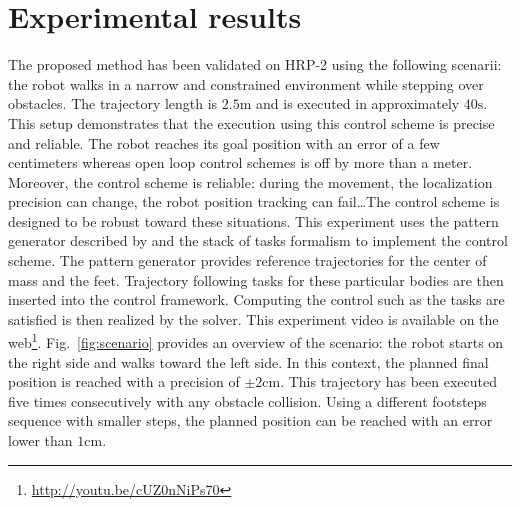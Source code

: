 \section{Experimental results}
\label{exp}
%
%
The proposed method has been validated on HRP-2 using the following
scenarii: the robot walks in a narrow and constrained environment
while stepping over obstacles. The trajectory length is
$2.5\mathrm{m}$ and is executed in approximately $40\mathrm{s}$.
%
%
This setup demonstrates that the execution using this control scheme
is precise and reliable. The robot reaches its goal position with an
error of a few centimeters whereas open loop control schemes is off by
more than a meter. Moreover, the control scheme is reliable: during
the movement, the localization precision can change, the robot
position tracking can fail\ldots The control scheme is designed to be
robust toward these situations.
%
%
This experiment uses the pattern generator described by
\cite{10icra.perrin} and the stack of tasks formalism
\cite{09icar.mansard} to implement the control scheme. The pattern
generator provides reference trajectories for the center of mass and
the feet. Trajectory following tasks for these particular bodies are
then inserted into the control framework. Computing the control such
as the tasks are satisfied is then realized by the solver.
%
%
This experiment video is available on the
web\footnote{\mbox{\url{http://youtu.be/cUZ0nNiPs70}}}. Fig.~\ref{fig:scenario}
provides an overview of the scenario: the robot starts on the right
side and walks toward the left side.
%
%
In this context, the planned final position is
reached with a precision of $\pm 2 \mathrm{cm}$. This trajectory has
been executed five times consecutively with any obstacle collision.
Using a different footsteps sequence with smaller steps, the planned
position can be reached with an error lower than $1 \mathrm{cm}$.
%
%
